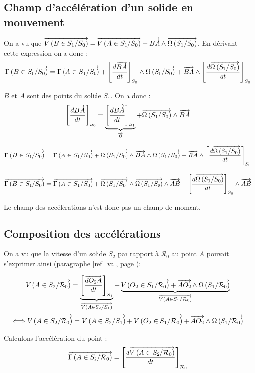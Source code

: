 \documentclass[10pt,oneside]{article}
\begin{document}
\subsection{Champ d'accélération d'un solide en mouvement}
On a vu que 
$\vectv{B}{S_1}{S_0} = \vectv{A}{S_1}{S_0} + \vect{BA} \wedge \vecto{S_1}{S_0}$. En dérivant cette expression on a donc : 
$$
\vectg{B}{S_1}{S_0} 
= \vectg{A}{S_1}{S_0} 
+\left[\dfrac{d\vect{BA}}{dt}\right]_{S_0} \wedge \vecto{S_1}{S_0}
+\vect{BA} \wedge \left[\dfrac{d\vecto{S_1}{S_0}}{dt}\right]_{S_0}
$$

$B$ et $A$ sont des points du solide $S_1$. On a donc : 
 $$
\left[\dfrac{d\vect{BA}}{dt}\right]_{S_0} =
\underbrace{\left[\dfrac{d\vect{BA}}{dt}\right]_{S_1}}_{\vect{0}} 
+ \vecto{S_1}{S_0} \wedge \vect{BA}
$$

$$
\vectg{B}{S_1}{S_0} 
= \vectg{A}{S_1}{S_0} 
+\vecto{S_1}{S_0} \wedge \vect{BA}
\wedge \vecto{S_1}{S_0}
+\vect{BA} \wedge \left[\dfrac{d\vecto{S_1}{S_0}}{dt}\right]_{S_0}
$$

$$
\vectg{B}{S_1}{S_0} 
= \vectg{A}{S_1}{S_0} 
+\vecto{S_1}{S_0} \wedge \vecto{S_1}{S_0}
\wedge \vect{AB}
+\left[\dfrac{d\vecto{S_1}{S_0}}{dt}\right]_{S_0} \wedge \vect{AB} 
$$

\begin{resultat}
Le champ des accélérations n'est donc pas un champ de moment.
\end{resultat}

\subsection{Composition des accélérations}
On a vu que la vitesse d'un solide $S_2$ par rapport à $\mathcal{R}_0$ au point $A$ pouvait s'exprimer ainsi (paragraphe \ref{ref_va}, page \pageref{ref_va}):

$$
\vectv{A}{S_2}{\mathcal{R}_0}
=
\underbrace{\left[\dfrac{\vect{dO_2 A}}{dt}\right]_{S_1}}_{\vectv{A}{S_2}{S_1}}
+
\underbrace{\vectv{O_2}{S_1}{\mathcal{R}_0}
+
\vect{AO_2}
\wedge 
\vecto{S_1}{\mathcal{R}_0}}_{\vectv{A}{S_1}{\mathcal{R}_0}}
$$
$$
\Longleftrightarrow
\vectv{A}{S_2}{\mathcal{R}_0}
=
\vectv{A}{S_2}{S_1} + \vectv{O_2}{S_1}{\mathcal{R}_0}
+
\vect{AO_2}
\wedge 
\vecto{S_1}{\mathcal{R}_0}
$$

Calculons l'accélération du point : 
$$
\vectg{A}{S_2}{\mathcal{R}_0}=
\left[
\dfrac{d\vectv{A}{S_2}{\mathcal{R}_0}}{dt}
\right]_{\mathcal{R}_0}
$$
\end{document}
